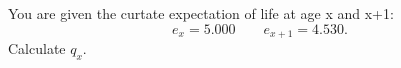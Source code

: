 You are given the curtate expectation of life at age x and x+1:
\[
   e_x = 5.000 \quad\quad e_{x+1} = 4.530.
\]
Calculate $q_x$.
